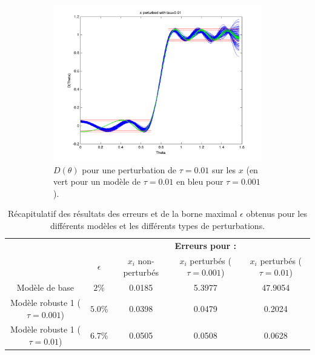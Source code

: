 \begin{figure}[h!]
\begin{subfigure}[b]{0.45\textwidth}
  \end{subfigure}
  \begin{subfigure}[b]{0.45\textwidth}
  \includegraphics[width=\textwidth]{D-ModRobust1-test3Rob01.png}
  \caption{$D(\theta)$ pour une perturbation de $\tau = 0.01$ sur les $x$ (en vert pour un modèle de $\tau=0.01$ en bleu pour $\tau=0.001$).}
  \label{fig:D-ModRobust1-test3RobTau01}
  \end{subfigure}
  \caption{}
  \end{figure}

\begin{table}
\centering
\begin{tabular}{c|c|ccc}
 & & & \textbf{Erreurs pour : } &\\
 & $\epsilon$ & $x_i$ non-perturbés & $x_i$ perturbés ($\tau=0.001$) & $x_i$ perturbés ($\tau=0.01$) \\
 \hline
Modèle de base & $2\%$ & 0.0185 & 5.3977 & 47.9054 \\
Modèle robuste 1 ($\tau=0.001$) & $5.0 \%$ & 0.0398 & 0.0479   & 0.2024 \\
Modèle robuste 1 ($\tau=0.01$)  & $6.7 \%$ & 0.0505 & 0.0508& 0.0628 \\
\end{tabular}
\caption{Récapitulatif des résultats des erreurs et de la borne maximal $\epsilon$ obtenus pour les différents modèles et les différents types de perturbations.}
\label{table:Recap}
\end{table}
\FloatBarrier